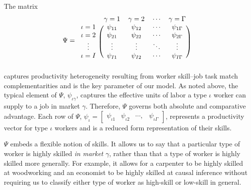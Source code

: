 \documentclass[12pt]{article}
\def\ig{\iota\gamma}
\def\g{\gamma}
\def\i{\iota}
\theoremstyle{definition}
\theoremstyle{plain}
\begin{document}
The matrix 
\begin{align}
\Psi =
\begin{blockarray}{ccccc}
& \gamma=1	& \gamma=2 	& \cdots	& \gamma=\Gamma 	\\
\begin{block}{c(cccc)}
\iota=1 	& \psi_{11} & \psi_{12} & \cdots 	& \psi_{1\Gamma} 	\\
\iota=2 	& \psi_{21} & \psi_{22}	& \cdots 	& \psi_{2\Gamma}	\\
\vdots 		& \vdots 	& \vdots 	& \ddots 	& \vdots			\\
\iota=I 	& \psi_{I1} & \psi_{I2} & \cdots 	& \psi_{I\Gamma}	\\
\end{block}
\end{blockarray} \label{eq:Psi}
\end{align}
captures productivity heterogeneity resulting from worker skill--job task match complementarities and is the key parameter of our model. As noted above, the typical element of $\Psi$, $\psi_{\ig}$, captures the effective units of labor a type $\i$ worker can supply to a job in market $\g$. Therefore, $\Psi$ governs both absolute and comparative advantage. Each row of $\Psi$, $\psi_\i = \begin{bmatrix}	\psi_{\i 1} & \psi_{\i 2} & \cdots , &  \psi_{\i \Gamma}	\end{bmatrix}$, represents a productivity vector for type $\i$ workers and is a reduced form representation of their skills. 


$\Psi$ embeds a flexible notion of skills. It allows us to say that a particular type of worker is highly skilled \emph{in market $\g$}, rather than that a type of worker is highly skilled more generally. For example, it allows for a carpenter to be highly skilled at woodworking and an economist to be highly skilled at causal inference without requiring us to classify either type of worker as high-skill or low-skill in general. 
\end{document}

